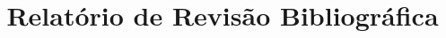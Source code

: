 \documentclass[12pt]{article}
\title{Relatório de Revisão Bibliográfica}
\author{}
\begin{document}

\pagebreak

\tableofcontents
\pagebreak



\pagebreak

\end{document}

